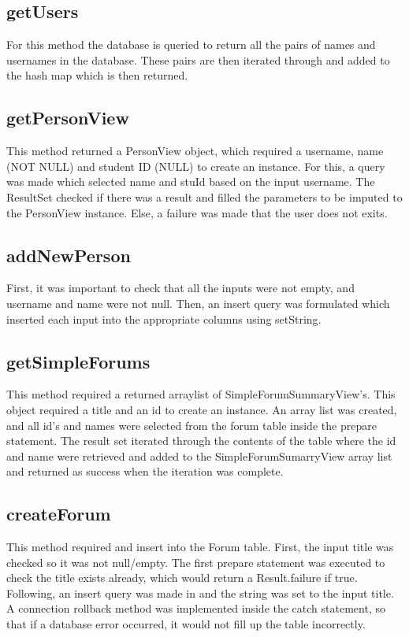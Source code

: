 \documentclass{article}
\begin{document}
\subsection*{getUsers}

For this method the database is queried to return all the pairs of names and usernames in the database. These pairs are then iterated through and added to the hash map which is then returned.

\subsection*{getPersonView}

This method returned a PersonView object, which required a username, name (NOT NULL) and student ID (NULL) to create an instance. For this, a query was made which selected name and stuId based on the input username. The ResultSet checked if there was a result and filled the parameters to be imputed to the PersonView instance. Else, a failure was made that the user does not exits.

\subsection*{addNewPerson}

First, it was important to check that all the inputs were not empty, and username and name were not null. Then, an insert query was formulated which inserted each input into the appropriate columns using setString.

\subsection*{getSimpleForums}

This method required a returned arraylist of SimpleForumSummaryView's. This object required a title and an id to create an instance. An array list was created, and all id's and names were selected from the forum table inside the prepare statement. The result set iterated through the contents of the table where the id and name were retrieved and added to the SimpleForumSumarryView array list and returned as success when the iteration was complete.
\subsection*{createForum}

This method required and insert into the Forum table. First, the input title was checked so it was not null/empty. The first prepare statement was executed to check the title exists already, which would return a Result.failure if true. Following, an insert query was made in and the string was set to the input title. A connection rollback method was implemented inside the catch statement, so that if a database error occurred, it would not fill up the table incorrectly.
\end{document}
